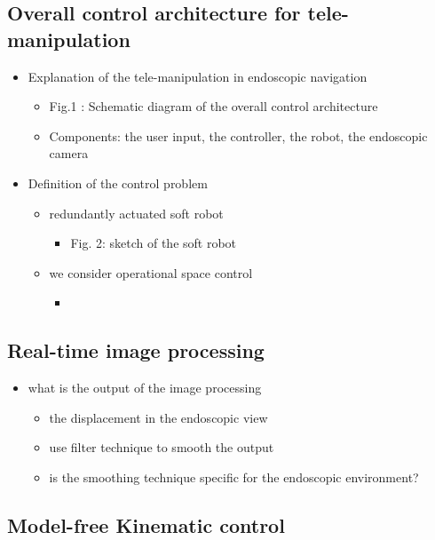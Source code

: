 \documentclass[journal,onecolumn]{IEEEtran}
\begin{document}
\subsection{Overall control architecture for tele-manipulation}
\label{sec:org7236731}
\begin{itemize}
\item Explanation of the tele-manipulation in endoscopic navigation
\begin{itemize}
\item Fig.1 : Schematic diagram of the overall control architecture
\item Components: the user input, the controller, the robot, the endoscopic camera
\end{itemize}

\item Definition of the control problem
\begin{itemize}
\item redundantly actuated soft robot
\begin{itemize}
\item Fig. 2: sketch of the soft robot
\end{itemize}
\item we consider operational space control
\begin{itemize}
\item 
\end{itemize}
\end{itemize}
\end{itemize}

\subsection{Real-time image processing}
\label{sec:orgfbb6cfb}
\begin{itemize}
\item what is the output of the image processing
\begin{itemize}
\item the displacement in the endoscopic view
\item use filter technique to smooth the output
\item is the smoothing technique specific for the endoscopic environment?
\end{itemize}
\end{itemize}

\subsection{Model-free Kinematic control}
\label{sec:orgcef095b}
\end{document}
